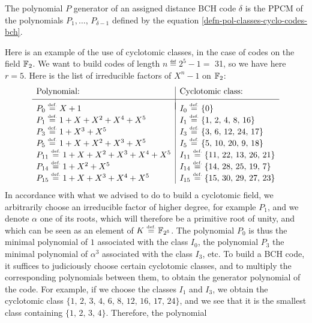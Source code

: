 \begin{prop}
The polynomial $ P $ generator of an assigned distance BCH code $ \delta $ is the PPCM of the polynomials $ P_1, \ldots, \, P_{\delta-1} $ defined by the equation \eqref{defn-pol-classes-cyclo-codes-bch}.
\end{prop}
 
 
\begin{exmp}
Here is an example of the use of cyclotomic classes, in the case of codes on the field $ \mathbb{F}_2 $. We want to build codes of length $ n \eqdef 2^5-1 = $ 31, so we have here $ r = 5 $. Here is the list of irreducible factors of $ X^n - 1 $ on $ \mathbb{F}_2 $:
\begin{equation*}
\begin{array}{l | l} \text{Polynomial:} & \text{Cyclotomic class:} \\[1mm] \hline \\[- 3mm] P_0 \stackrel{\mbox{\upshape\tiny def.}}{=} X + 1 & I_0 \stackrel{\mbox{\upshape\tiny def.}}{=} \{0\} \\P_1 \stackrel{\mbox{\upshape\tiny def.}}{=} 1 + X + X^2 + X^4 + X^5 & I_1 \stackrel{\mbox{\upshape\tiny def.}}{=} \{1, \, 2, \, 4, \, 8, \, 16\} \\P_3 \stackrel{\mbox{\upshape\tiny def.}}{=} 1 + X^3 + X^5 & I_3 \stackrel{\mbox{\upshape\tiny def.}}{=} \{3, \, 6, \, 12, \, 24, \, 17\} \\P_5 \stackrel{\mbox{\upshape\tiny def.}}{=} 1 + X + X^2 + X^3 + X^5 & I_5 \stackrel{\mbox{\upshape\tiny def.}}{=} \{5, \, 10, \, 20, \, 9, \, 18\} \\P_{11} \stackrel{\mbox{\upshape\tiny def.}}{=} 1 + X + X^2 + X^3 + X^4 + X^5 & I_{11} \stackrel{\mbox{\upshape\tiny def.}}{=} \{11, \, 22, \, 13, \, 26, \, 21\} \\P_{14} \stackrel{\mbox{\upshape\tiny def.}}{=} 1 + X^2 + X^5 & I_{14} \stackrel{\mbox{\upshape\tiny def.}}{=} \{14, \, 28, \, 25, \, 19, \, 7\} \\P_{15} \stackrel{\mbox{\upshape\tiny def.}}{=} 1 + X + X^3 + X^4 + X^5 & I_{15 } \stackrel{\mbox{\upshape\tiny def.}}{=} \{15, \, 30, \, 29, \, 27, \, 23\} \end{array}
\end{equation*}
In accordance with what we advised to do to build a cyclotomic field, we arbitrarily choose an irreducible factor of higher degree, for example $ P_1 $, and we denote $ \alpha $ one of its roots, which will therefore be a primitive root of unity, and which can be seen as an element of $ K \stackrel{\mbox{\upshape\tiny def.}}{=} \mathbb{F}_{2^5} $. The polynomial $ P_0 $ is thus the minimal polynomial of $ 1 $ associated with the class $ I_0 $, the polynomial $ P_3 $ the minimal polynomial of $ \alpha^3 $ associated with the class $ I_3 $, etc. To build a BCH code, it suffices to judiciously choose certain cyclotomic classes, and to multiply the corresponding polynomials between them, to obtain the generator polynomial of the code. For example, if we choose the classes $ I_1 $ and $ I_3 $, we obtain the cyclotomic class $ \{1, \, 2, \, 3, \, 4, \, 6, \, 8, \, 12, \, 16, \, 17, \, 24\} $, and we see that it is the smallest class containing $ \{1, \, 2, \, 3, \, 4\} $. Therefore, the polynomial

\end{exmp}
